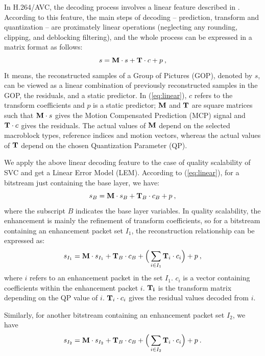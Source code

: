 \documentclass[journal]{IEEEtran}
\begin{document}
In H.264/AVC, the decoding process involves a linear feature described in \cite{Winken08}. According to this feature, the main steps of decoding -- prediction, transform and quantization -- are proximately linear operations (neglecting any rounding, clipping, and deblocking filtering), and the whole process can be expressed in a matrix format as follows:
\begin{equation}
\label{eq:linear}
s = {\rm\bf M} \cdot s + {\rm\bf T} \cdot c + p \: ,
\end{equation}
It means, the reconstructed samples of a Group of Pictures (GOP), denoted by $s$, can be viewed as a linear combination of previously reconstructed samples in the GOP, the residuals, and a static predictor. In (\ref{eq:linear}), $c$ refers to the transform coefficients and $p$ is a static predictor; ${\rm\bf M}$ and ${\rm\bf T}$ are square matrices such that ${\rm\bf M} \cdot s$ gives the Motion Compensated Prediction (MCP) signal and ${\rm\bf T} \cdot c$ gives the residuals. The actual values of ${\rm\bf M}$ depend on the selected macroblock types, reference indices and motion vectors, whereas the actual values of ${\rm\bf T}$ depend on the chosen Quantization Parameter (QP).

We apply the above linear decoding feature to the case of quality scalability of SVC and get a Linear Error Model (LEM). According to (\ref{eq:linear}), for a bitstream just containing the base layer, we have:
\begin{equation}
\label{eq:base0}
s_{B} = {\rm\bf M} \cdot s_{B} + {\rm\bf T}_{B} \cdot c_{B} + p \: ,
\end{equation}
where the subscript $B$ indicates the base layer variables. In quality scalability, the enhancement is mainly the refinement of transform coefficients, so for a bitstream containing an enhancement packet set $I_1$, the reconstruction relationship can be expressed as:
\begin{equation}
\label{eq:subset1}
s_{I_1} = {\rm\bf M} \cdot s_{I_1} + {\rm\bf T}_{B} \cdot c_{B} + \Big( \sum_{i \in I_1}{\rm\bf T}_i \cdot c_i \Big) + p \: ,
\end{equation}
where $i$ refers to an enhancement packet in the set $I_1$. $c_i$ is a vector containing coefficients within the enhancement packet $i$. ${\rm\bf T_i}$ is the transform matrix depending on the QP value of $i$. ${\rm\bf T}_i \cdot c_i$ gives the residual values decoded from $i$.

Similarly, for another bitstream containing an enhancement packet set $I_2$, we have
\begin{equation}
\label{eq:subset2}
s_{I_2} = {\rm\bf M} \cdot s_{I_2} + {\rm\bf T}_{B} \cdot c_{B} + \Big( \sum_{i \in I_2}{\rm\bf T}_i \cdot c_i \Big) + p \: .
\end{equation}
\end{document}
